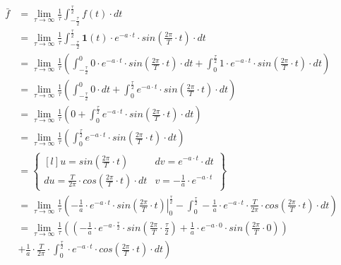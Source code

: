 \begin{task}
\begin{align*}
\bar{f} &=\lim_{\tau \rightarrow \infty }\frac{1}{\tau}\int_{-\frac{\tau}{2}}^{\frac{\tau}{2}}f(t) \cdot dt\\
 &=\lim_{\tau \rightarrow \infty }\frac{1}{\tau}\int_{-\frac{\tau}{2}}^{\frac{\tau}{2}} \mathbf{1}(t)\cdot e^{-a\cdot t}\cdot sin\left(\frac{2\pi}{T}\cdot t \right) \cdot dt\\
 &=\lim_{\tau \rightarrow \infty }\frac{1}{\tau}\left(
 \int_{-\frac{\tau}{2}}^{0} 0 \cdot e^{-a\cdot t}\cdot sin\left(\frac{2\pi}{T}\cdot t \right) \cdot dt +
 \int_{0}^{\frac{\tau}{2}} 1 \cdot e^{-a\cdot t}\cdot sin\left(\frac{2\pi}{T}\cdot t \right) \cdot dt \right)\\
 &=\lim_{\tau \rightarrow \infty }\frac{1}{\tau}\left(
 \int_{-\frac{\tau}{2}}^{0} 0 \cdot dt +
 \int_{0}^{\frac{\tau}{2}} e^{-a\cdot t}\cdot sin\left(\frac{2\pi}{T}\cdot t \right) \cdot dt \right)\\
 &=\lim_{\tau \rightarrow \infty }\frac{1}{\tau}\left(
 0 +
 \int_{0}^{\frac{\tau}{2}} e^{-a\cdot t}\cdot sin\left(\frac{2\pi}{T}\cdot t \right) \cdot dt \right)\\
 &=\lim_{\tau \rightarrow \infty }\frac{1}{\tau}\left(
 \int_{0}^{\frac{\tau}{2}} e^{-a\cdot t}\cdot sin\left(\frac{2\pi}{T}\cdot t \right) \cdot dt \right)\\
 &=\begin{Bmatrix*}[l]
 u=sin(\frac{2\pi}{T}\cdot t) & dv = e^{-a \cdot t}\cdot dt\\ 
 du=\frac{T}{2\pi} \cdot cos(\frac{2\pi}{T}\cdot t)\cdot dt & v=-\frac{1}{a}\cdot e^{-a\cdot t}
 \end{Bmatrix*}\\
 &=\lim_{\tau \rightarrow \infty }\frac{1}{\tau}\left(
 \left. -\frac{1}{a}\cdot e^{-a\cdot t} \cdot sin \left(\frac{2\pi}{T}\cdot t\right) \right|_{0}^{\frac{\tau}{2}}
 -\int_{0}^{\frac{\tau}{2}} -\frac{1}{a}\cdot e^{-a\cdot t} \cdot \frac{T}{2\pi} \cdot cos\left(\frac{2\pi}{T}\cdot t\right)\cdot dt
 \right)\\
 &=\lim_{\tau \rightarrow \infty }\frac{1}{\tau}\left(
 \left( -\frac{1}{a}\cdot e^{-a\cdot \frac{\tau}{2}} \cdot sin \left(\frac{2\pi}{T}\cdot \frac{\tau}{2}\right) + \frac{1}{a}\cdot e^{-a\cdot 0} \cdot sin \left(\frac{2\pi}{T}\cdot 0\right) \right)\right.\\
 &\left.+\frac{1}{a} \cdot \frac{T}{2\pi} \cdot \int_{0}^{\frac{\tau}{2}} \cdot e^{-a\cdot t} \cdot cos\left(\frac{2\pi}{T}\cdot t\right)\cdot dt \right)\\

\end{align*}
\end{task}
